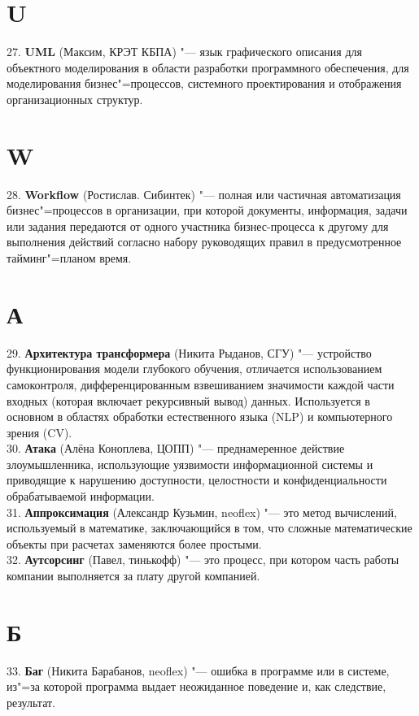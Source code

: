 \documentclass[14 pt]{extarticle}
\begin{document}
\section*{U}
    27. \textbf{UML} (Максим, КРЭТ КБПА) "--- язык графического описания для объектного моделирования в области разработки программного обеспечения, для моделирования бизнес"=процессов, системного проектирования и отображения организационных структур. \\

\section*{W}
    28. \textbf{Workflow} (Ростислав. Сибинтек) "--- полная или частичная автоматизация бизнес"=процессов в организации, при которой документы, информация, задачи или задания передаются от одного участника бизнес-процесса к другому для выполнения действий согласно набору руководящих правил в предусмотренное тайминг"=планом время. \\

\section*{А}
    29. \textbf{Архитектура трансформера} (Никита Рыданов, СГУ) "--- устройство функционирования модели глубокого обучения, отличается использованием самоконтроля, дифференцированным взвешиванием значимости каждой части входных (которая включает рекурсивный вывод) данных. Используется в основном в областях обработки естественного языка (NLP) и компьютерного зрения (CV). \\
    
    30. \textbf{Атака} (Алёна Коноплева, ЦОПП) "--- преднамеренное действие злоумышленника, использующие уязвимости информационной системы и приводящие к нарушению доступности, целостности и конфиденциальности обрабатываемой информации.\\
    
    31. \textbf{Аппроксимация} (Александр Кузьмин, neoflex) "--- это метод вычислений, используемый в математике, заключающийся в том, что сложные математические объекты при расчетах заменяются более простыми. \\

    32. \textbf{Аутсорсинг} (Павел, тинькофф) "--- это процесс, при котором часть работы компании выполняется за плату другой компанией. \\
    
\section*{Б}
    33. \textbf{Баг} (Никита Барабанов, neoflex) "--- ошибка в программе или в системе, из"=за которой программа выдает неожиданное поведение и, как следствие, результат. \\
    
\end{document}
